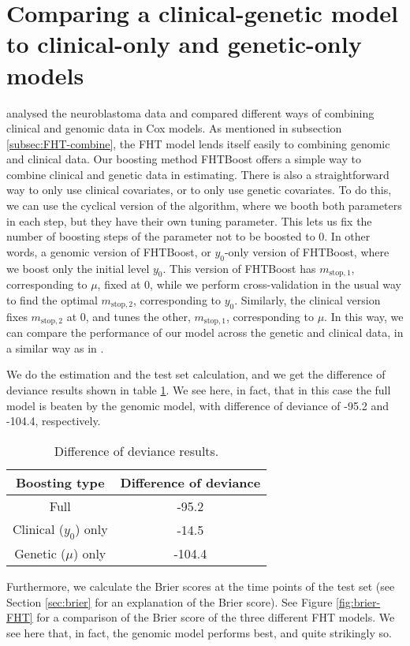\section{Comparing a clinical-genetic model to clinical-only and genetic-only models}
\citet{bovelstad2009} analysed the neuroblastoma data and compared different ways of combining clinical and genomic data in Cox models.
As mentioned in subsection \ref{subsec:FHT-combine}, the FHT model lends itself easily to combining genomic and clinical data.
Our boosting method FHTBoost offers a simple way to combine clinical and genetic data in estimating.
There is also a straightforward way to only use clinical covariates, or to only use genetic covariates.
To do this, we can use the cyclical version of the algorithm, where we booth both parameters in each step, but they have their own tuning parameter.
This lets us fix the number of boosting steps of the parameter not to be boosted to 0.
In other words, a genomic version of FHTBoost, or $y_0$-only version of FHTBoost, where we boost only the initial level $y_0$.
This version of FHTBoost has $m_{\text{stop},1}$, corresponding to $\mu$, fixed at 0, while we perform cross-validation in the usual way to find the optimal $m_{\text{stop},2}$, corresponding to $y_0$.
Similarly, the clinical version fixes $m_{\text{stop},2}$ at 0, and tunes the other, $m_{\text{stop},1}$, corresponding to $\mu$.
In this way, we can compare the performance of our model across the genetic and clinical data, in a similar way as in \citet{bovelstad2009}.

We do the estimation and the test set calculation, and we get the difference of deviance results shown in table \ref{tab:deviances}.
We see here, in fact, that in this case the full model is beaten by the genomic model, with difference of deviance of -95.2 and -104.4, respectively.

\begin{table}
\caption{Difference of deviance results.}
\label{tab:deviances}
\centering
\begin{tabular}{cc}
\toprule
Boosting type & Difference of deviance \\
\hline
Full & -95.2 \\
Clinical ($y_0$) only  & -14.5 \\
Genetic ($\mu$) only & -104.4 \\
\bottomrule
\end{tabular}
\end{table}

Furthermore, we calculate the Brier scores at the time points of the test set (see Section \ref{sec:brier} for an explanation of the Brier score).
See Figure \ref{fig:brier-FHT} for a comparison of the Brier score of the three different FHT models.
We see here that, in fact, the genomic model performs best, and quite strikingly so.

